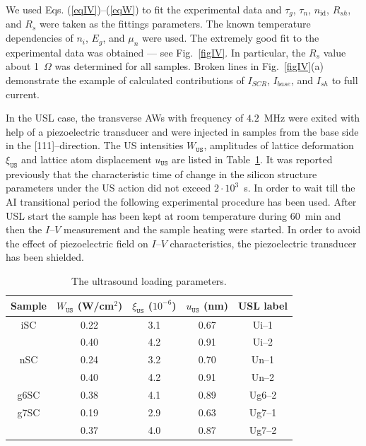 \documentclass[aip,jap, amsmath,amssymb,reprint]{revtex4-1}
\begin{document}
We used Eqs. (\ref{eqIV})--(\ref{eqW}) to fit the experimental data and $\tau_g$, $\tau_n$, $n_{\mathrm{id}}$, $R_{sh}$, and $R_s$ were taken as the  fittings parameters.
The known \cite{ni:Green,Schroder2006,Markvart} temperature dependencies of $n_i$, $E_g$, and $\mu_n$ were used.
The extremely good fit to the experimental data was obtained --- see Fig.~\ref{figIV}.
In particular, the $R_s$ value about 1~$\Omega$ was determined for all samples.
Broken lines in Fig.~\ref{figIV}(a) demonstrate the example of calculated contributions of $I_{SCR}$, $I_{base}$, and $I_{sh}$ to full current.

In the USL case, the transverse AWs with frequency of $4.2$~MHz were exited with help of a piezoelectric transducer and were injected in samples from the base side in the [111]--direction.
The US intensities $W_{\mathtt{US}}$, amplitudes of lattice deformation $\xi_{\mathtt{US}}$ and lattice atom
displacement  $u_{\mathtt{US}}$ are listed in Table~\ref{tabUSL}.
It was reported previously \cite{Ostapenko1995,Olikh:Ultras,Ostrovskii2001} that the characteristic time of change in the silicon structure parameters under
the US action  did not exceed $2\cdot10^3$~s.
In order to wait till the AI transitional period the following experimental procedure has been used.
After USL start the sample has been kept at room temperature during 60~min and then the $I$--$V$ measurement and the sample heating were started.
In order to avoid the effect of piezoelectric field on $I$--$V$ characteristics, the piezoelectric transducer has been shielded.


\begin{table}
\caption{\label{tabUSL}The ultrasound loading parameters.
}
\begin{ruledtabular}
\begin{tabular}{ccccc}
Sample&$W_{\mathtt{US}}$ (W/cm$^2$)&$\xi_{\mathtt{US}}$ ($10^{-6}$)&$u_{\mathtt{US}}$ (nm)&USL label\\
\hline
iSC&0.22&3.1&0.67&Ui--1\\
&0.40&4.2&0.91&Ui--2\\
nSC&0.24&3.2&0.70&Un--1\\
&0.40&4.2&0.91&Un--2\\
g6SC&0.38&4.1&0.89&Ug6--2\\
g7SC&0.19&2.9&0.63&Ug7--1\\
&0.37&4.0&0.87&Ug7--2\\
\end{tabular}
\end{ruledtabular}
\end{table}
\end{document}
